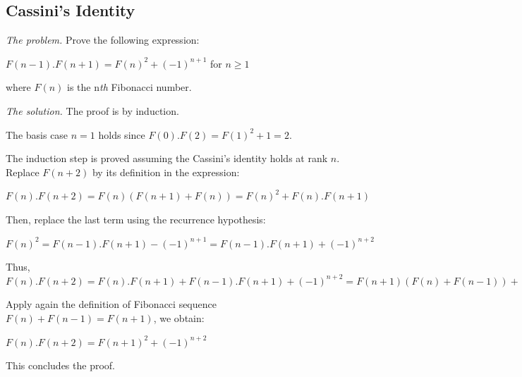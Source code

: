 \subsection{Cassini's Identity}


\noindent \textit{The problem.}
Prove the following expression:

$F(n-1).F(n+1) = F(n)^2 + (-1)^{n+1}$ for $n \geq 1$

where $F(n)$ is the n\textit{th} Fibonacci number.
\medskip

%
%
%
%
%

\noindent \textit{The solution.}
The proof is by induction.

The basis case $n=1$ holds since $F(0).F(2) = F(1)^2 +1 = 2$.

The induction step is proved assuming the Cassini's identity holds at rank $n$.
Replace $F(n+2)$ by its definition in the expression:
 
$F(n).F(n+2) = F(n) (F(n+1)+F(n)) = F(n)^2 + F(n).F(n+1)$

Then, replace the last term using the recurrence hypothesis:

$F(n)^2 = F(n-1).F(n+1) - (-1)^{n+1} =F(n-1).F(n+1) + (-1)^{n+2} $

Thus,
$F(n).F(n+2) = F(n).F(n+1) + F(n-1).F(n+1) + (-1)^{n+2} = F(n+1) (F(n) + F(n-1)) + (-1)^{n+2}$ 

Apply again the definition of Fibonacci sequence $F(n) + F(n-1) = F(n+1)$, we obtain:

$F(n).F(n+2) = F(n+1)^2 + (-1)^{n+2}$

This concludes the proof. 


%
%
%
%
%



